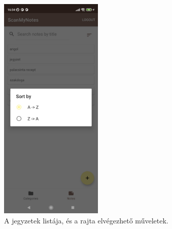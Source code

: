 \begin{figure}[!ht]
	\includegraphics[width=49mm, keepaspectratio]{figures/notelist_sort.jpg}
	\caption{A jegyzetek listája, és a rajta elvégezhető műveletek.}
	\label{fig:NoteListScreen2}
\end{figure}
\newpage
